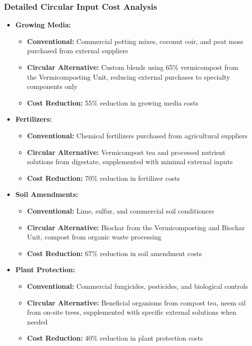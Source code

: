 \subsubsection{Detailed Circular Input Cost Analysis}
\begin{itemize}
    \item \textbf{Growing Media:}
    \begin{itemize}
        \item \textbf{Conventional:} Commercial potting mixes, coconut coir, and peat moss purchased from external suppliers
        \item \textbf{Circular Alternative:} Custom blends using 65\% vermicompost from the Vermicomposting Unit, reducing external purchases to specialty components only
        \item \textbf{Cost Reduction:} 55\% reduction in growing media costs
    \end{itemize}
    
    \item \textbf{Fertilizers:}
    \begin{itemize}
        \item \textbf{Conventional:} Chemical fertilizers purchased from agricultural suppliers
        \item \textbf{Circular Alternative:} Vermicompost tea and processed nutrient solutions from digestate, supplemented with minimal external inputs
        \item \textbf{Cost Reduction:} 70\% reduction in fertilizer costs
    \end{itemize}
    
    \item \textbf{Soil Amendments:}
    \begin{itemize}
        \item \textbf{Conventional:} Lime, sulfur, and commercial soil conditioners
        \item \textbf{Circular Alternative:} Biochar from the Vermicomposting and Biochar Unit, compost from organic waste processing
        \item \textbf{Cost Reduction:} 67\% reduction in soil amendment costs
    \end{itemize}
    
    \item \textbf{Plant Protection:}
    \begin{itemize}
        \item \textbf{Conventional:} Commercial fungicides, pesticides, and biological controls
        \item \textbf{Circular Alternative:} Beneficial organisms from compost tea, neem oil from on-site trees, supplemented with specific external solutions when needed
        \item \textbf{Cost Reduction:} 40\% reduction in plant protection costs
    \end{itemize}
    

\end{itemize}

